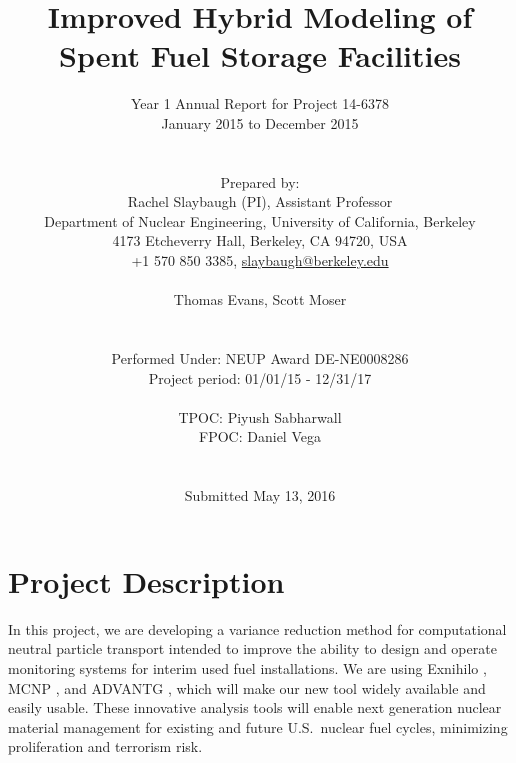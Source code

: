 \documentclass[12pt]{article}
\title{Improved Hybrid Modeling of Spent Fuel Storage Facilities}
\author{ 
  Year 1 Annual Report for Project 14-6378\\
  January 2015 to December 2015\\
  \\
  \\
  Prepared by:\\
  Rachel Slaybaugh (PI), Assistant Professor \\
  Department of Nuclear Engineering, University of California, Berkeley \\
  4173 Etcheverry Hall, Berkeley, CA 94720, USA\\
  +1 570 850 3385, 
  \href{mailto:slaybaugh@berkeley.edu}{slaybaugh@berkeley.edu}\\
  \\
  Thomas Evans, Scott Moser\\
  \\
  \\
  Performed Under: NEUP Award DE-NE0008286\\
  Project period: 01/01/15 - 12/31/17 \\
  \\
  TPOC: Piyush Sabharwall\\
  FPOC: Daniel Vega\\
  \\
  \\
  Submitted May 13, 2016
}
\begin{document}


\maketitle
\clearpage
\tableofcontents
\clearpage
%

%

\section{Project Description}
\label{sect::project}

In this project, we are developing a variance reduction method for computational neutral particle transport intended to improve the ability to design and operate monitoring systems for interim used fuel installations. 
We are using Exnihilo \cite{evans_denovo:_2010}, MCNP \cite{brown_mcnp_2002}, and ADVANTG \cite{mosher_new_2010}, which will make our new tool widely available and easily usable. 
These innovative analysis tools will enable next generation nuclear material management for existing and future U.S.\ nuclear fuel cycles, minimizing proliferation and terrorism risk.
\end{document}
